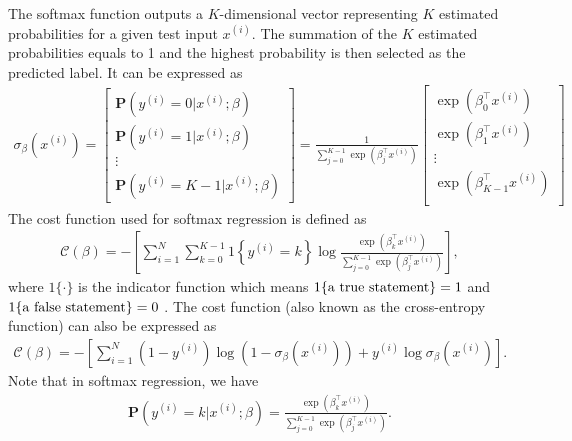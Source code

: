 \documentclass[a4paper]{article}
\begin{document}
The softmax function outputs a $K$-dimensional vector representing $K$ estimated probabilities for a given test input $x^{(i)}$. The summation of the $K$ estimated probabilities equals to 1 and the highest probability is then selected as the predicted label. It can be expressed as 
\begin{align}
    \sigma_\beta(x^{(i)}) =
    \begin{bmatrix}
    \mathbf{P}(y^{(i)} = 0 | x^{(i)}; {\beta}) \\
    \mathbf{P}(y^{(i)} = 1 | x^{(i)}; {\beta}) \\
    \vdots \\
    \mathbf{P}(y^{(i)} = K-1 | x^{(i)}; {\beta})
    \end{bmatrix}
    =
    \frac{1}{ \sum_{j=0}^{K-1} \exp{(\beta_j^{\top} x^{(i)}) }}
    \begin{bmatrix}
    \exp{(\beta_0^{\top} x^{(i)})} \\
    \exp{(\beta_1^{\top} x^{(i)})} \\
    \vdots \\
    \exp{(\beta_{K-1}^{\top} x^{(i)})} \\
    \end{bmatrix}
\end{align}
The cost function used for softmax regression is defined as
\begin{align}
    \mathcal{C}(\beta) = - \left[ \sum_{i=1}^{N} \sum_{k=0}^{K-1}  1\left\{y^{(i)} = k\right\} 
    \log \frac {\exp{(\beta_{k}^{\top} x^{(i)})}}{\sum_{j=0}^{K-1} \exp{(\beta_{j}^{\top} x^{(i)})}}\right],
    \label{mclog-cost}
\end{align}
where $1\{\cdot\}$ is the indicator function which means $1\{\hbox{a true statement}\}=1$ and $1\{\hbox{a false statement}\}=0$ \cite{softmax}. The cost function (also known as the cross-entropy function) can also be expressed as
\begin{align}
    \mathcal{C}(\beta) 
    = - \left[ \sum_{i=1}^N (1-y^{(i)}) \log (1-\sigma_\beta(x^{(i)})) + y^{(i)} \log \sigma_\beta(x^{(i)}) \right].
    \label{cost_softmax}
\end{align}
Note that in softmax regression, we have 
\begin{align}
    \mathbf{P}(y^{(i)} = k | x^{(i)};\beta) 
    = \frac{\exp(\beta_k^{\top} x^{(i)})}{\sum_{j=0}^{K-1} \exp(\beta_j^{\top} x^{(i)})}.
\end{align}
\end{document}
